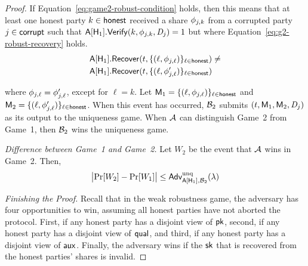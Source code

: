 \begin{proof}
If Equation~\ref{eq:game2-robust-condition} holds,
then this means that at least one honest party $k \in \mathsf{honest}$ received a share $\phi_{j,k}$ from a corrupted party $j \in \mathsf{corrupt}$
such that $\mathsf{A}[\mathsf{H}_1].\mathsf{Verify}(k, \phi_{j,k}, \textit{D}_j) = 1$
but where Equation~\ref{eq:g2-robust-recovery} holds.
\begin{align} \label{eq:g2-robust-recovery}
  \begin{split}
 & \mathsf{A}[\mathsf{H}_1].\mathsf{Recover}(t, \{(\ell,\phi_{j,\ell}) \}_{\ell \in \mathsf{honest}}) \neq \\
 & \mathsf{A}[\mathsf{H}_1].\mathsf{Recover}(t, \{(\ell,\phi_{j,\ell}') \}_{\ell \in \mathsf{honest}})
  \end{split}
\end{align}


\noindent where $\phi_{j, \ell} = \phi_{j, \ell}'$,
except for $\ell = k$.
Let $\mathsf{M}_1 = \{(\ell,\phi_{j,\ell}) \}_{\ell \in \mathsf{honest}}$ and
$\mathsf{M}_2 = \{(\ell,\phi_{j,\ell}') \}_{\ell \in \mathsf{honest}}$.
When this event has occurred,
$\mathcal{B}_2$ submits $(t, \mathsf{M}_1, \mathsf{M}_2, \textit{D}_j)$ as its output to the \AVSS uniqueness game.
When $\mathcal{A}$ can distinguish Game~2 from Game~1,
then $\mathcal{B}_2$ wins the \AVSS uniqueness game.

\medskip

\noindent \textit{Difference between Game~1 and Game~2.}
Let $W_2$ be the event that $\mathcal{A}$ wins in Game~2. Then,
\begin{equation} \label{eq:game2-robust}
  \bigl|  \Pr[W_2] -  \Pr[W_1]   \bigr| \leq \textsf{\upshape Adv}^{\textrm{\upshape unq}}_{\mathsf{A}[\mathsf{H}_1],\mathcal{B}_2}(\lambda)
\end{equation}



\medskip

\noindent \textit{Finishing the Proof.}
Recall that in the weak robustness game,
the adversary has four opportunities to win,
assuming all honest parties have not aborted the protocol.
First, if any honest party has a disjoint view of $\mathsf{pk}$,
second, if any honest party has a disjoint view of $\mathsf{qual}$,
and third, if any honest party has a disjoint view of $\mathsf{aux}$.
Finally, the adversary wins if the $\mathsf{sk}$ that is recovered from the honest parties' shares is invalid.


\end{proof}
